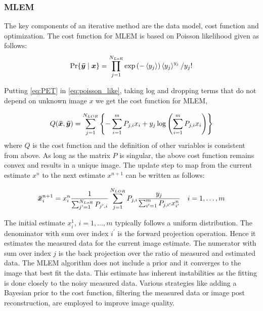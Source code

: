 \subsubsection{\ac{MLEM}}
The key components of an iterative method are the data model, cost function and optimization. The cost function for \ac{MLEM} is based on Poisson likelihood given as follows:
\begin{equation}\label{eq:poisson_like}
\operatorname{Pr}\{\bm{\bar{y}} \mid \bm{x}\}=\prod_{j=1}^{N_{L o R}} \exp \left(-\left\langle y_{j}\right\rangle\right)\left\langle y_{j}\right\rangle^{y_{j}} / y_{j} !
\end{equation}

Putting \ref{eq:PET} in \ref{eq:poisson_like}, taking log and dropping terms that do not depend on unknown image $x$ we get the cost function for \ac{MLEM},

\begin{equation}
Q(\bm{\bar{x}}, \bm{\bar{y}})=\sum_{j=1}^{N_{L O R}}\left\{-\sum_{i=1}^{m} P_{j, i} x_{i}+y_{j} \log \left(\sum_{i=1}^{m} P_{j, i} x_{i}\right)\right\}
\end{equation}
where $Q$ is the cost function and the definition of other variables is consistent from above. As long as the matrix $P$ is singular, the above cost function remains convex and results in a unique image. 
The update step to map from the current estimate $x^{n}$ to the next estimate $x^{n+1}$ can be written as follows:

\begin{equation}
\bm{\bar{x}}_{i}^{n+1}=x_{i}^{n} \frac{1}{\sum_{j^{\prime}=1}^{N_{L o R}} P_{j^{\prime}, i}} \sum_{j=1}^{N_{L O R}} P_{j, i} \frac{y_{j}}{\sum_{i^{\prime}=1}^{m} P_{j, i^{\prime}} x_{i^{\prime}}^{n}} \quad i=1, \ldots, m
\end{equation}

The initial estimate $x_i^{1}$, $i=1, \ldots, m$ typically follows a uniform distribution. The denominator with sum over index $i^{\prime}$ is the forward projection operation. Hence it estimates the measured data for the current image estimate. The numerator with sum over index $j$ is the back projection over the ratio of measured and estimated data. The \ac{MLEM} algorithm does not include a prior and it converges to the image that best fit the data. This estimate has inherent instabilities as the fitting is done closely to the noisy measured data. Various strategies like adding a Bayesian prior to the cost function, filtering the measured data or image post reconstruction, are employed to improve image quality. 


